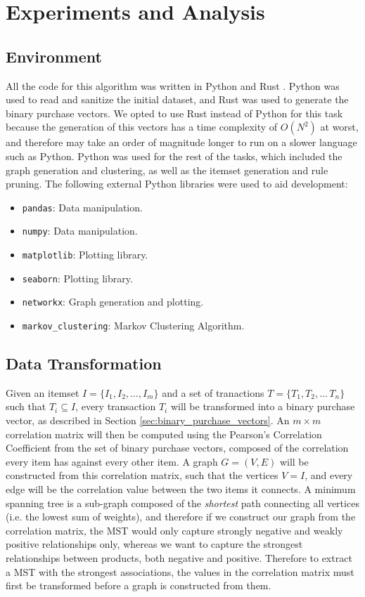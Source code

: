 \chapter{Experiments and Analysis}

\section{Environment}
All the code for this algorithm was written in Python  and Rust . Python was used to read and sanitize the initial dataset, and Rust was used to generate the binary purchase vectors. We opted to use Rust instead of Python for this task because the generation of this vectors has a time complexity of $O(N^2)$ at worst, and therefore may take an order of magnitude longer to run on a slower language such as Python. Python was used for the rest of the tasks, which included the graph generation and clustering, as well as the itemset generation and rule pruning. The following external Python libraries were used to aid development:
\begin{itemize}
\item \texttt{pandas}: Data manipulation.
\item \texttt{numpy}: Data manipulation.
\item \texttt{matplotlib}: Plotting library.
\item \texttt{seaborn}: Plotting library.
\item \texttt{networkx}: Graph generation and plotting.
\item \texttt{markov\_clustering}: Markov Clustering Algorithm.
\end{itemize}

\section{Data Transformation}
\label{sec:algo_data}
Given an itemset $I = \{I_1, I_2,\dots,I_m\}$ and a set of tranactions $T = \{T_1,T_2,\dots\,T_n\}$ such that $T_i \subseteq I$, every transaction $T_i$ will be transformed into a binary purchase vector, as described in Section \ref{sec:binary_purchase_vectors}. An $m \times m$ correlation matrix will then be computed using the Pearson's Correlation Coefficient from the set of binary purchase vectors, composed of the correlation every item has against every other item. A graph $G = (V,E)$ will be constructed from this correlation matrix, such that the vertices $V=I$, and every edge will be the correlation value between the two items it connects. A minimum spanning tree is a sub-graph composed of the \textit{shortest} path connecting all vertices (i.e. the lowest sum of weights), and therefore if we construct our graph from the correlation matrix, the MST would only capture strongly negative and weakly positive relationships only, whereas we want to capture the strongest relationships between products, both negative and positive. Therefore to extract a MST with the strongest associations, the values in the correlation matrix must first be transformed before a graph is constructed from them.

